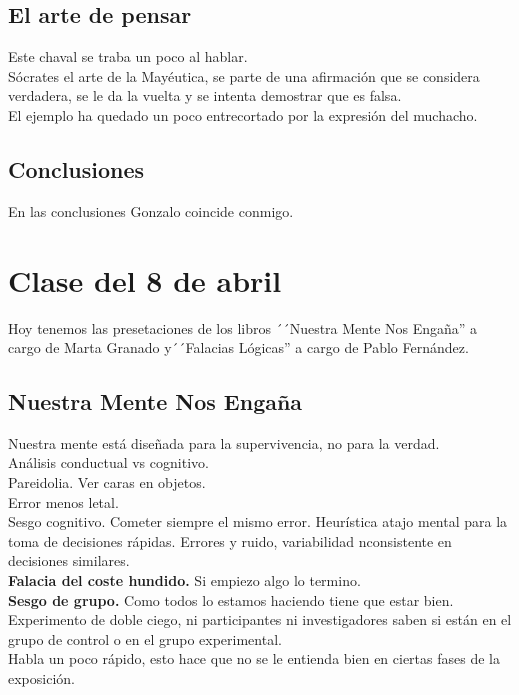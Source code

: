 \documentclass[12pt, a4paper, twoside]{article}
\begin{document}
\subsection{El arte de pensar}
Este chaval se traba un poco al hablar.\\
Sócrates el arte de la Mayéutica, se parte de una afirmación que se considera verdadera,
se le da la vuelta y se intenta demostrar que es falsa.\\
El ejemplo ha quedado un poco entrecortado por la expresión del muchacho.\\

\subsection{Conclusiones}
En las conclusiones Gonzalo coincide conmigo.\\

\section{Clase del 8 de abril}
Hoy tenemos las presetaciones de los libros ´´Nuestra Mente Nos Engaña'' a cargo de 
Marta Granado y´´Falacias Lógicas'' a cargo de Pablo Fernández.\\
\subsection{Nuestra Mente Nos Engaña}
Nuestra mente está diseñada para la supervivencia, no para la verdad.\\
Análisis conductual vs cognitivo.\\
Pareidolia. Ver caras en objetos.\\
Error menos letal.\\
Sesgo cognitivo. Cometer siempre el mismo error. Heurística atajo mental para la 
toma de decisiones rápidas. Errores y ruido, variabilidad nconsistente en decisiones
similares.\\
\textbf{Falacia del coste hundido.} Si empiezo algo lo termino.\\
\textbf{Sesgo de grupo.} Como todos lo estamos haciendo tiene que estar bien.\\

Experimento de doble ciego, ni participantes ni investigadores saben si están en el grupo 
de control o en el grupo experimental.\\




Habla un poco rápido, esto hace que no se le entienda bien en ciertas fases de la exposición.\\
\end{document}

